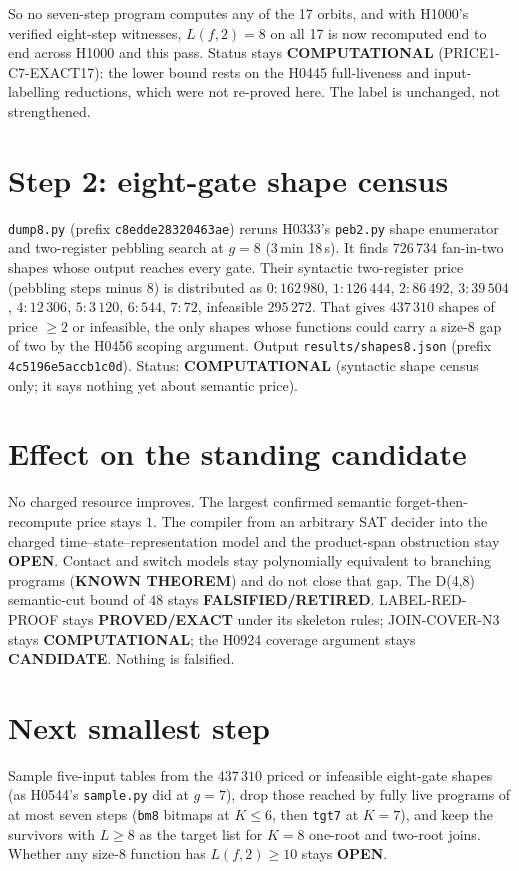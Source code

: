 \documentclass[11pt]{article}
\begin{document}
So no seven-step program computes any of the 17 orbits, and with H1000's verified eight-step witnesses, $L(f,2)=8$ on all 17 is now recomputed end to end across H1000 and this pass. Status stays \textbf{COMPUTATIONAL} (PRICE1-C7-EXACT17): the lower bound rests on the H0445 full-liveness and input-labelling reductions, which were not re-proved here. The label is unchanged, not strengthened.

\section*{Step 2: eight-gate shape census}
\texttt{dump8.py} (prefix \texttt{c8edde28320463ae}) reruns H0333's \texttt{peb2.py} shape enumerator and two-register pebbling search at $g=8$ (3\,min 18\,s). It finds $726\,734$ fan-in-two shapes whose output reaches every gate. Their syntactic two-register price (pebbling steps minus $8$) is distributed as
$0{:}162\,980$, $1{:}126\,444$, $2{:}86\,492$, $3{:}39\,504$, $4{:}12\,306$, $5{:}3\,120$, $6{:}544$, $7{:}72$, infeasible $295\,272$.
That gives $437\,310$ shapes of price $\ge2$ or infeasible, the only shapes whose functions could carry a size-8 gap of two by the H0456 scoping argument. Output \texttt{results/shapes8.json} (prefix \texttt{4c5196e5accb1c0d}). Status: \textbf{COMPUTATIONAL} (syntactic shape census only; it says nothing yet about semantic price).

\section*{Effect on the standing candidate}
No charged resource improves. The largest confirmed semantic forget-then-recompute price stays $1$. The compiler from an arbitrary SAT decider into the charged time--state--representation model and the product-span obstruction stay \textbf{OPEN}. Contact and switch models stay polynomially equivalent to branching programs (\textbf{KNOWN THEOREM}) and do not close that gap. The D(4,8) semantic-cut bound of $48$ stays \textbf{FALSIFIED/RETIRED}. LABEL-RED-PROOF stays \textbf{PROVED/EXACT} under its skeleton rules; JOIN-COVER-N3 stays \textbf{COMPUTATIONAL}; the H0924 coverage argument stays \textbf{CANDIDATE}. Nothing is falsified.

\section*{Next smallest step}
Sample five-input tables from the $437\,310$ priced or infeasible eight-gate shapes (as H0544's \texttt{sample.py} did at $g=7$), drop those reached by fully live programs of at most seven steps (\texttt{bm8} bitmaps at $K\le6$, then \texttt{tgt7} at $K=7$), and keep the survivors with $L\ge8$ as the target list for $K=8$ one-root and two-root joins. Whether any size-8 function has $L(f,2)\ge10$ stays \textbf{OPEN}.
\end{document}
